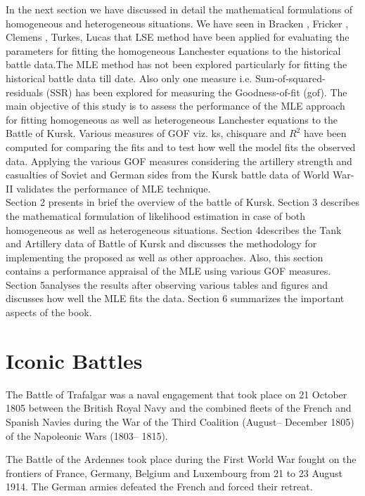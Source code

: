 \documentclass[]{article}
\begin{document}
In the next section we have discussed in detail the mathematical formulations of homogeneous and heterogeneous situations. We have seen in Bracken \autocite{Bracken:1995}, Fricker \autocite{Fricker:1998} , Clemens \autocite{Clemens:1997} , Turkes\autocite{Turkes:2000}, Lucas \autocite{LukasTurkes:2004} that LSE method have been applied for evaluating the parameters for fitting the homogeneous Lanchester equations to the historical battle data.The MLE method \autocite{rohatgi2015introduction,Taylor:1983} has not been explored particularly for fitting the historical battle data till date. Also only one measure i.e. Sum-of-squared-residuals (SSR) has been explored for measuring the Goodness-of-fit (\acrshort{gof}). The main objective of this study is to assess the performance of the MLE approach for fitting homogeneous as well as heterogeneous Lanchester equations to the Battle of Kursk. Various measures of GOF \autocite{Agustino:1986} viz. \acrlong{ks}, \acrlong{chisquare} and $R^2$ have been computed for comparing the fits and to test how well the model fits the observed data. Applying the various GOF measures considering the artillery strength and casualties of Soviet and German sides from the Kursk battle data of World War-II validates the performance of MLE technique.\\Section 2 presents in brief the overview of the battle of Kursk. Section 3 describes the mathematical formulation of likelihood estimation in case of both homogeneous as well as heterogeneous situations. Section 4describes the Tank and Artillery data of Battle of Kursk and discusses the methodology for implementing the proposed as well as other approaches. Also, this section contains a performance appraisal of the MLE using various GOF measures. Section 5analyses the results after observing various tables and figures and discusses how well the MLE fits the data. Section 6 summarizes the important aspects of the book.
\newpage
\section{Iconic Battles}
The Battle of Trafalgar was a naval engagement that took place on 21 October 1805 between the British Royal Navy and the combined fleets of the French and Spanish Navies during the War of the Third Coalition (August–
December 1805) of the Napoleonic Wars (1803– 1815)\cite{BattleOfTrafalgar}.

The Battle of the Ardennes took place during the First World War fought on the frontiers of France, Germany, Belgium and Luxembourg from 21 to 23 August 1914. The German armies defeated the French and forced their retreat. 
\end{document}
